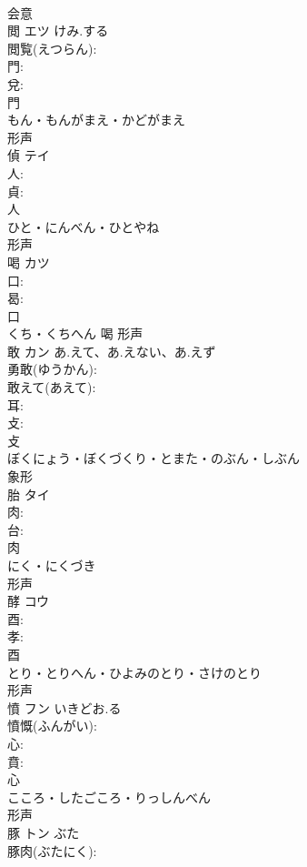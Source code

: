 \documentclass[8pt]{extreport}
\begin{document}
\begin{CJK}{UTF8}{min}
\\	会意 
\\	閲	エツ	けみ.する		
\\	閲覧(えつらん): 
\\	門: 
\\	兌: 
\\	門	
\\	もん・もんがまえ・かどがまえ	
\\	形声 
\\	偵	テイ			
\\	人: 
\\	貞: 
\\	人	
\\	ひと・にんべん・ひとやね	
\\	形声 
\\	喝	カツ			
\\	口: 
\\	曷: 
\\	口	
\\	くち・くちへん	喝	形声 
\\	敢	カン	あ.えて、あ.えない、あ.えず		
\\	勇敢(ゆうかん): 
\\	敢えて(あえて): 
\\	耳: 
\\	攴: 
\\	攴	
\\	ぼくにょう・ぼくづくり・とまた・のぶん・しぶん	
\\	象形 
\\	胎	タイ			
\\	肉: 
\\	台: 
\\	肉	
\\	にく・にくづき	
\\	形声 
\\	酵	コウ			
\\	酉: 
\\	孝: 
\\	酉	
\\	とり・とりへん・ひよみのとり・さけのとり	
\\	形声 
\\	憤	フン	いきどお.る		
\\	憤慨(ふんがい): 
\\	心: 
\\	賁: 
\\	心	
\\	こころ・したごころ・りっしんべん	
\\	形声 
\\	豚	トン	ぶた		
\\	豚肉(ぶたにく): 

\end{CJK}
\end{document}
